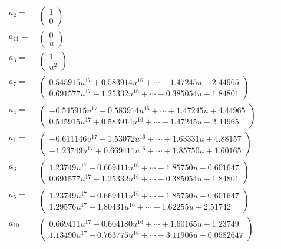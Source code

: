 \documentclass[1p]{elsarticle_modified}
\theoremstyle{definition}
\begin{document}
\begin{tabular}{m{7pt} m{180pt} m{7pt} m{180pt} }
\flushright $a_{2}=$&$\begin{pmatrix}1\\0\end{pmatrix}$ \\
\flushright $a_{11}=$&$\begin{pmatrix}0\\u\end{pmatrix}$ \\
\flushright $a_{3}=$&$\begin{pmatrix}1\\u^2\end{pmatrix}$ \\
\flushright $a_{7}=$&$\begin{pmatrix}0.545915 u^{17}+0.583914 u^{16}+\cdots-1.47245 u-2.44965\\0.691577 u^{17}-1.25332 u^{16}+\cdots-0.385054 u+1.84801\end{pmatrix}$ \\
\flushright $a_{4}=$&$\begin{pmatrix}-0.545915 u^{17}-0.583914 u^{16}+\cdots+1.47245 u+4.44965\\0.545915 u^{17}+0.583914 u^{16}+\cdots-1.47245 u-2.44965\end{pmatrix}$ \\
\flushright $a_{1}=$&$\begin{pmatrix}-0.611146 u^{17}-1.53072 u^{16}+\cdots+1.63331 u+4.88157\\-1.23749 u^{17}+0.669411 u^{16}+\cdots+1.85750 u+1.60165\end{pmatrix}$ \\
\flushright $a_{6}=$&$\begin{pmatrix}1.23749 u^{17}-0.669411 u^{16}+\cdots-1.85750 u-0.601647\\0.691577 u^{17}-1.25332 u^{16}+\cdots-0.385054 u+1.84801\end{pmatrix}$ \\
\flushright $a_{5}=$&$\begin{pmatrix}1.23749 u^{17}-0.669411 u^{16}+\cdots-1.85750 u-0.601647\\1.29576 u^{17}-1.80431 u^{16}+\cdots-1.62255 u+2.51742\end{pmatrix}$ \\
\flushright $a_{10}=$&$\begin{pmatrix}0.669411 u^{17}-0.604180 u^{16}+\cdots+1.60165 u+1.23749\\1.13490 u^{17}+0.763775 u^{16}+\cdots-3.11906 u+0.0582647\end{pmatrix}$ \\

\end{tabular}
\end{document}
